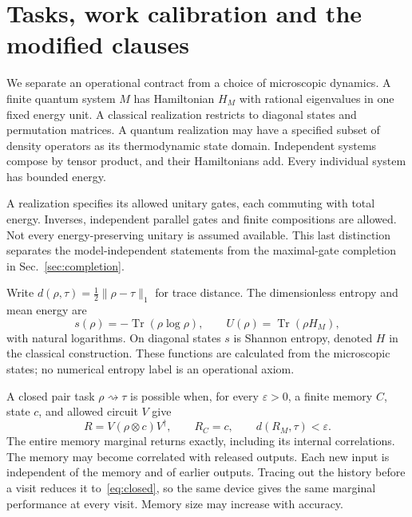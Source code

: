 \documentclass[11pt,a4paper]{article}
\DeclareMathOperator{\Tr}{Tr}
\begin{document}
\section{Tasks, work calibration and the modified clauses}
We separate an operational contract from a choice of microscopic dynamics. A finite quantum system $M$ has Hamiltonian $H_M$ with rational eigenvalues in one fixed energy unit. A classical realization restricts to diagonal states and permutation matrices. A quantum realization may have a specified subset of density operators as its thermodynamic state domain. Independent systems compose by tensor product, and their Hamiltonians add. Every individual system has bounded energy.

A realization specifies its allowed unitary gates, each commuting with total energy. Inverses, independent parallel gates and finite compositions are allowed. Not every energy-preserving unitary is assumed available. This last distinction separates the model-independent statements from the maximal-gate completion in Sec.~\ref{sec:completion}.

Write $d(\rho,\tau)=\tfrac12\|\rho-\tau\|_1$ for trace distance. The dimensionless entropy and mean energy are
\begin{equation}
 s(\rho)=-\Tr(\rho\log\rho),\qquad U(\rho)=\Tr(\rho H_M), \label{eq:entropy}
\end{equation}
with natural logarithms. On diagonal states $s$ is Shannon entropy, denoted $H$ in the classical construction. These functions are calculated from the microscopic states; no numerical entropy label is an operational axiom.

A closed pair task $\rho\rightsquigarrow\tau$ is possible when, for every $\varepsilon>0$, a finite memory $C$, state $c$, and allowed circuit $V$ give
\begin{equation}
 R=V(\rho\otimes c)V^\dagger,\qquad R_C=c,\qquad d(R_M,\tau)<\varepsilon. \label{eq:closed}
\end{equation}
The entire memory marginal returns exactly, including its internal correlations. The memory may become correlated with released outputs. Each new input is independent of the memory and of earlier outputs. Tracing out the history before a visit reduces it to~\eqref{eq:closed}, so the same device gives the same marginal performance at every visit. Memory size may increase with accuracy.
\end{document}
